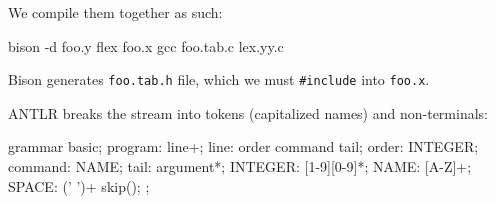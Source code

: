 \documentclass{article}
\begin{document}
We compile them together as such:
\begin{ffcode}
bison -d foo.y
flex foo.x
gcc foo.tab.c lex.yy.c
\end{ffcode}

Bison generates \texttt{foo.tab.h} file, which we must \texttt{\#include} into \texttt{foo.x}.
\plush{}


ANTLR breaks the stream into tokens (capitalized names) and non-terminals:
\begin{ffcode}
grammar basic;
program: line+;
line: order command tail;
order: INTEGER;
command: NAME;
tail: argument*;
INTEGER: [1-9][0-9]*;
NAME: [A-Z]+;
SPACE: (' ')+ { skip(); };
\end{ffcode}
\plush{}
\end{document}
